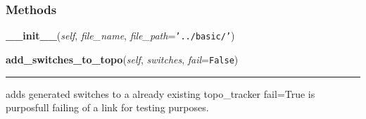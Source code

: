   \subsubsection{Methods}

    \label{make_topology:topo_tracker:__init__}

    \vspace{0.5ex}

\hspace{.8\funcindent}\begin{boxedminipage}{\funcwidth}

    \raggedright \textbf{\_\_init\_\_}(\textit{self}, \textit{file\_name}, \textit{file\_path}={\tt \texttt{'}\texttt{../basic/}\texttt{'}})

\setlength{\parskip}{2ex}
\setlength{\parskip}{1ex}
    \end{boxedminipage}

    \label{make_topology:topo_tracker:add_switches_to_topo}

    \vspace{0.5ex}

\hspace{.8\funcindent}\begin{boxedminipage}{\funcwidth}

    \raggedright \textbf{add\_switches\_to\_topo}(\textit{self}, \textit{switches}, \textit{fail}={\tt False})

    \vspace{-1.5ex}

    \rule{\textwidth}{0.5\fboxrule}
\setlength{\parskip}{2ex}
    adds generated switches to a already existing topo\_tracker fail=True 
    is purposfull failing of a link for testing purposes.

\setlength{\parskip}{1ex}
    \end{boxedminipage}

    \label{make_topology:topo_tracker:add_hosts_to_topo}

    \vspace{0.5ex}

